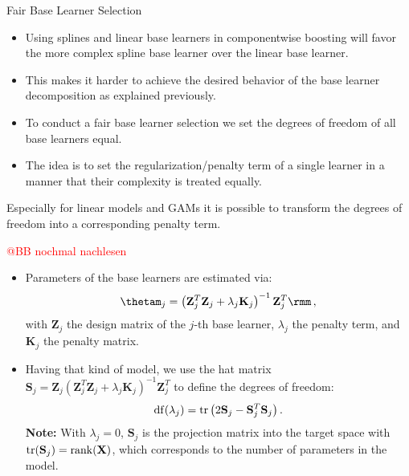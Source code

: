 \begin{vbframe}{Fair Base Learner Selection}

\begin{itemize}

  \item
    Using splines and linear base learners in componentwise boosting will favor 
    the more complex spline base learner over the linear base learner.

  \item
    This makes it harder to achieve the desired behavior of the base learner 
    decomposition as explained previously.

  \item
    To conduct a fair base learner selection we set the degrees of freedom of all base learners equal.

  \item
    The idea is to set the regularization/penalty term of a single learner in a manner that their complexity is treated equally.

\end{itemize}

\framebreak


Especially for linear models and GAMs it is possible to transform the degrees of freedom into a corresponding penalty term.

\textcolor{red}{@BB nochmal nachlesen}

\begin{itemize}

  \item
    Parameters of the base learners are estimated via:
    $$
    \thetam_j = \left(\mathbf{Z}_j^T \mathbf{Z}_j + \lambda_j \mathbf{K}_j
    \right)^{-1}\mathbf{Z}_j^T \rmm\,,
    $$
    with $\mathbf{Z}_j$ the design matrix of the $j$-th base learner, 
    $\lambda_j$ the penalty term, and $\mathbf{K}_j$ the penalty matrix.

  \item
    Having that kind of model, we use the hat matrix 
    $\mathbf{S}_j = \mathbf{Z}_j\left(\mathbf{Z}_j^T \mathbf{Z}_j + 
    \lambda_j \mathbf{K}_j\right)^{-1}\mathbf{Z}_j^T$ to define the degrees of 
    freedom:
    $$
    \operatorname{df}(\lambda_j) = \operatorname{tr}\left(2\mathbf{S}_j - \mathbf{S}_j^T
    \mathbf{S}_j\right).
    $$
    \textbf{Note:} With $\lambda_j = 0$, $\mathbf{S}_j$ is the projection matrix 
    into the target space with 
    $\operatorname{tr}(\mathbf{S}_j) = \operatorname{rank}(\mathbf{X})$, which corresponds to 
    the number of parameters in the model.


\end{itemize}
\end{vbframe}
